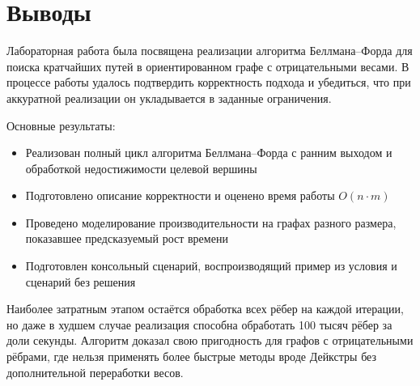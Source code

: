 \section{Выводы}
Лабораторная работа была посвящена реализации алгоритма Беллмана--Форда для поиска кратчайших путей в ориентированном графе с отрицательными весами. В процессе работы удалось подтвердить корректность подхода и убедиться, что при аккуратной реализации он укладывается в заданные ограничения.

Основные результаты:
\begin{itemize}
\item Реализован полный цикл алгоритма Беллмана--Форда с ранним выходом и обработкой недостижимости целевой вершины
\item Подготовлено описание корректности и оценено время работы $O(n \cdot m)$
\item Проведено моделирование производительности на графах разного размера, показавшее предсказуемый рост времени
\item Подготовлен консольный сценарий, воспроизводящий пример из условия и сценарий без решения
\end{itemize}

Наиболее затратным этапом остаётся обработка всех рёбер на каждой итерации, но даже в худшем случае реализация способна обработать 100 тысяч рёбер за доли секунды. Алгоритм доказал свою пригодность для графов с отрицательными рёбрами, где нельзя применять более быстрые методы вроде Дейкстры без дополнительной переработки весов.

\pagebreak
